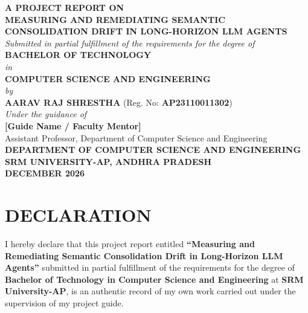 \documentclass[12pt,a4paper]{report}
\begin{document}
\begin{titlepage}
    \centering
    \vspace*{0.5cm}
    {\large \textbf{A PROJECT REPORT ON}}\\[0.8cm]
    {\LARGE \textbf{MEASURING AND REMEDIATING SEMANTIC CONSOLIDATION DRIFT IN LONG-HORIZON LLM AGENTS}}\\[1.5cm]
    
    {\large \textit{Submitted in partial fulfillment of the requirements for the degree of}}\\[0.3cm]
    {\large \textbf{BACHELOR OF TECHNOLOGY}}\\[0.2cm]
    {\large \textit{in}}\\[0.2cm]
    {\large \textbf{COMPUTER SCIENCE AND ENGINEERING}}\\[1.2cm]
    
    {\large \textit{by}}\\[0.4cm]
    \textbf{AARAV RAJ SHRESTHA} \quad (Reg. No: \textbf{AP23110011302})\\[1.2cm]
    
    {\large \textit{Under the guidance of}}\\[0.3cm]
    \textbf{[Guide Name / Faculty Mentor]}\\[0.2cm]
    {Assistant Professor, Department of Computer Science and Engineering}\\[1.5cm]
    
    \vspace*{0.5cm}
    {\large \textbf{DEPARTMENT OF COMPUTER SCIENCE AND ENGINEERING}}\\[0.2cm]
    {\large \textbf{SRM UNIVERSITY-AP, ANDHRA PRADESH}}\\[0.2cm]
    {\large \textbf{DECEMBER 2026}}
\end{titlepage}

\setcounter{page}{2}

\chapter*{DECLARATION}

I hereby declare that this project report entitled \textbf{``Measuring and Remediating Semantic Consolidation Drift in Long-Horizon LLM Agents''} submitted in partial fulfillment of the requirements for the degree of \textbf{Bachelor of Technology in Computer Science and Engineering} at \textbf{SRM University-AP}, is an authentic record of my own work carried out under the supervision of my project guide.
\end{document}

